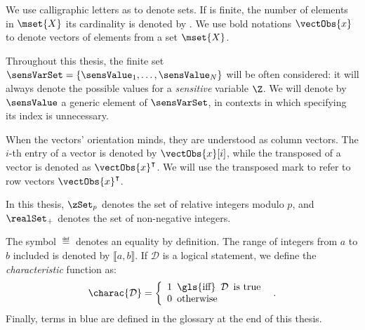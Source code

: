 We use calligraphic letters as  to denote sets.
If  is \gls{finite}, the number of elements in \(\mset{X}\) \aka{} its cardinality is denoted by .
We use bold notations \(\vectObs{x}\) to denote vectors of elements from a set \(\mset{X}\).

Throughout this thesis, the finite set \(\sensVarSet = \{\sensValue_1, \ldots, \sensValue_N\}\) will be often considered: it will always denote the possible values for a \emph{sensitive} variable \(\Z\).
We will denote by \(\sensValue\) a generic element of \(\sensVarSet\), in contexts in which specifying its index is unnecessary.

When the vectors' orientation minds, they are understood as column vectors.
The \(i\)-th entry of a vector  is denoted by \(\vectObs{x}[i]\), while the transposed of a vector  is denoted as \(\vectObs{x}^\intercal\).
We will use the transposed mark to refer to row vectors \(\vectObs{x}^\intercal\).

In this thesis, \(\zSet_p\) denotes the set of relative integers modulo \(p\), and \(\realSet_+\) denotes the set of non-negative integers.

The symbol \(\eqdef\) denotes an equality by definition.
The range of integers from \(a\) to \(b\) included is denoted by \(\llbracket a, b \rrbracket\).
If \(\mathcal{D}\) is a logical statement, we define the \emph{characteristic} function as:
\begin{equation}
	\charac{\mathcal{D}} = 
	\left\{
	\begin{array}{l}
		1 \enspace \mbox{\gls{iff}} \enspace \mathcal{D} \enspace \mbox{is true} \\
		0 \enspace \mbox{otherwise}
	\end{array}
	\right. \enspace .
\end{equation}
Finally, terms in blue are defined in the glossary at the end of this thesis.